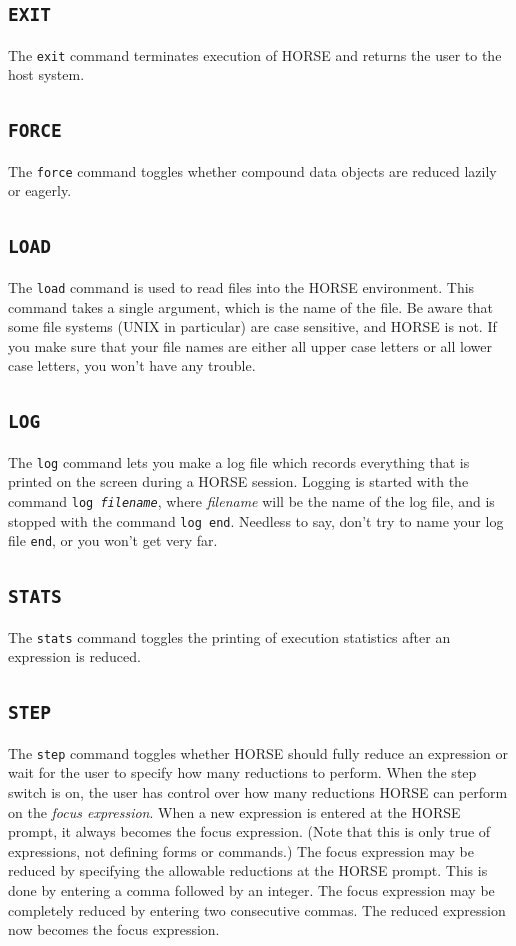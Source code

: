 \subsection{{\tt EXIT}}

	The {\tt exit} command terminates execution of HORSE and returns the user
to the host system.

\subsection{{\tt FORCE}}

	The {\tt force} command toggles whether compound data objects are reduced
lazily or eagerly.


\subsection{{\tt LOAD}}

	The {\tt load} command is used to read files into the HORSE
environment.  This command takes a single argument, which is the name of
the file.  Be aware that some file systems (UNIX in particular) are case
sensitive, and HORSE is not.  If you make sure that your file names
are either all upper case letters or all lower case letters, you
won't have any trouble.

\subsection{{\tt LOG}}

	The {\tt log} command lets you make a log file which records everything
that is printed on the screen during a HORSE session.  Logging
is started with the command {\tt log {\sl filename}}, where {\sl
filename} will be the name of the log file, and is stopped with the
command {\tt log end}.  Needless to say, don't try to name your log file
{\tt end}, or you won't get very far.


\subsection{{\tt STATS}}

	The {\tt stats} command toggles the printing of execution statistics
after an expression is reduced.

\subsection{{\tt STEP}}

	The {\tt step} command toggles whether HORSE should fully reduce an
expression or wait for the user to specify how many reductions to
perform.  When the step switch is on, the user has control over how many
reductions HORSE can perform on the {\em focus expression}.  When a new
expression is entered at the HORSE prompt, it always becomes the focus
expression.  (Note that this is only true of expressions, not defining
forms or commands.)  The focus expression may be reduced by specifying the allowable
reductions at the HORSE prompt.  This is done by entering a comma
followed by an integer.  The focus expression may be completely reduced
by entering two consecutive commas.  The reduced expression now
becomes the focus expression.

